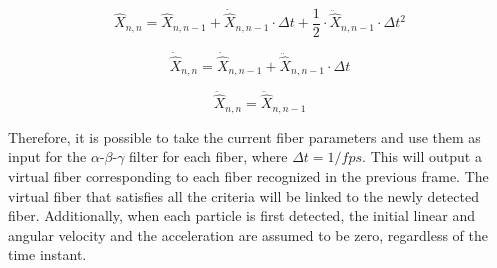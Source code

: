 \begin{equation}
    \hat{X}_{n,n} = \hat{X}_{n,n-1} + \dot{\hat{X}}_{n,n-1} \cdot \Delta t + \frac{1}{2} \cdot \ddot{\hat{X}}_{n,n-1} \cdot \Delta t^2
\end{equation}

\begin{equation}
    \dot{\hat{X}}_{n,n} = \dot{\hat{X}}_{n,n-1} + \ddot{\hat{X}}_{n,n-1} \cdot \Delta t
\end{equation}

\begin{equation}
    \ddot{\hat{X}}_{n,n} = \ddot{\hat{X}}_{n,n-1}
\end{equation}

Therefore, it is possible to take the current fiber parameters and use them as input for the $\alpha$-$\beta$-$\gamma$ filter for each fiber, where $\Delta t = 1/fps$. This will output a virtual fiber corresponding to each fiber recognized in the previous frame. The virtual fiber that satisfies all the criteria will be linked to the newly detected fiber. Additionally, when each particle is first detected, the initial linear and angular velocity and the acceleration are assumed to be zero, regardless of the time instant.


